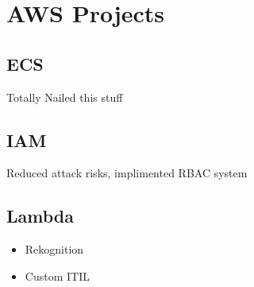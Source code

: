 \documentclass[]{friggeri-cv-a4}
\begin{document}
\section{AWS Projects}
\subsection{ECS}
Totally Nailed this stuff
\subsection{IAM}
Reduced attack risks, implimented RBAC system
\subsection{Lambda}
\begin{itemize}
 			\item Rekognition
 			\item Custom ITIL
\end{itemize}
\end{document}
